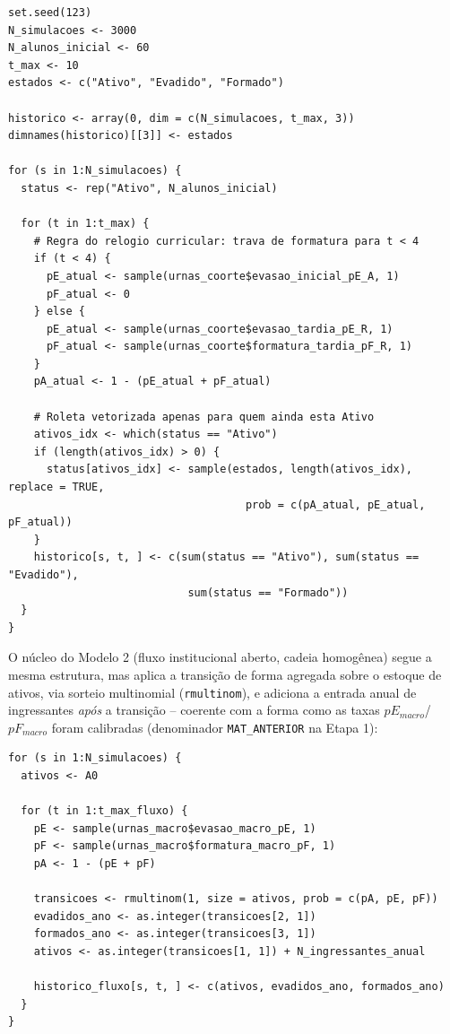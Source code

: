 \documentclass[12pt,times,article,chapter=TITLE]{abnt}
\begin{document}
\begin{verbatim}
set.seed(123)
N_simulacoes <- 3000
N_alunos_inicial <- 60
t_max <- 10
estados <- c("Ativo", "Evadido", "Formado")

historico <- array(0, dim = c(N_simulacoes, t_max, 3))
dimnames(historico)[[3]] <- estados

for (s in 1:N_simulacoes) {
  status <- rep("Ativo", N_alunos_inicial)

  for (t in 1:t_max) {
    # Regra do relogio curricular: trava de formatura para t < 4
    if (t < 4) {
      pE_atual <- sample(urnas_coorte$evasao_inicial_pE_A, 1)
      pF_atual <- 0
    } else {
      pE_atual <- sample(urnas_coorte$evasao_tardia_pE_R, 1)
      pF_atual <- sample(urnas_coorte$formatura_tardia_pF_R, 1)
    }
    pA_atual <- 1 - (pE_atual + pF_atual)

    # Roleta vetorizada apenas para quem ainda esta Ativo
    ativos_idx <- which(status == "Ativo")
    if (length(ativos_idx) > 0) {
      status[ativos_idx] <- sample(estados, length(ativos_idx), replace = TRUE,
                                     prob = c(pA_atual, pE_atual, pF_atual))
    }
    historico[s, t, ] <- c(sum(status == "Ativo"), sum(status == "Evadido"),
                            sum(status == "Formado"))
  }
}
\end{verbatim}

O núcleo do Modelo 2 (fluxo institucional aberto, cadeia homogênea) segue a mesma estrutura, mas aplica a transição de forma agregada sobre o estoque de ativos, via sorteio multinomial (\texttt{rmultinom}), e adiciona a entrada anual de ingressantes \emph{após} a transição -- coerente com a forma como as taxas $pE_{macro}$/$pF_{macro}$ foram calibradas (denominador \texttt{MAT\_ANTERIOR} na Etapa 1):

\begin{verbatim}
for (s in 1:N_simulacoes) {
  ativos <- A0

  for (t in 1:t_max_fluxo) {
    pE <- sample(urnas_macro$evasao_macro_pE, 1)
    pF <- sample(urnas_macro$formatura_macro_pF, 1)
    pA <- 1 - (pE + pF)

    transicoes <- rmultinom(1, size = ativos, prob = c(pA, pE, pF))
    evadidos_ano <- as.integer(transicoes[2, 1])
    formados_ano <- as.integer(transicoes[3, 1])
    ativos <- as.integer(transicoes[1, 1]) + N_ingressantes_anual

    historico_fluxo[s, t, ] <- c(ativos, evadidos_ano, formados_ano)
  }
}
\end{verbatim}
\end{document}
